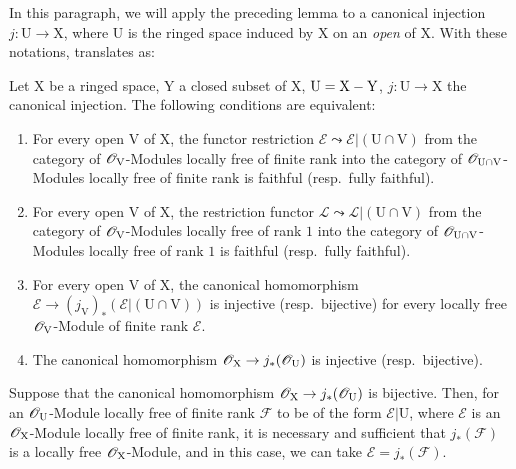 In this paragraph, we will apply the preceding lemma to a canonical injection $j:\mathrm{U}\to\mathrm{X}$, where $\mathrm{U}$ is the ringed space induced by $\mathrm{X}$ on an \emph{open} of $\mathrm{X}$.
With these notations,  translates as:

\begin{corollary}[21.13.3]
\label{IV.21.13.3}
Let $\mathrm{X}$ be a ringed space, $\mathrm{Y}$ a closed subset of $\mathrm{X}$, $\mathrm{U}=\mathrm{X}-\mathrm{Y}$, $j:\mathrm{U}\to\mathrm{X}$ the canonical injection.
The following conditions are equivalent:
\begin{enumerate}[label=\emph{\alph*)}]
  \item For every open $\mathrm{V}$ of $\mathrm{X}$, the functor restriction $\mathscr{E}\leadsto\mathscr{E}|(\mathrm{U}\cap\mathrm{V})$ from the category of $\mathscr{O}_{\mathrm{V}}$-Modules locally free of finite rank into the category of $\mathscr{O}_{\mathrm{U}\cap\mathrm{V}}$-Modules locally free of finite rank is faithful \textup{(resp.}\ fully faithful\textup{)}.
  \item[\emph{a')}] For every open $\mathrm{V}$ of $\mathrm{X}$, the restriction functor $\mathscr{L}\leadsto\mathscr{L}|(\mathrm{U}\cap\mathrm{V})$ from the category of $\mathscr{O}_{\mathrm{V}}$-Modules locally free of rank $1$ into the category of $\mathscr{O}_{\mathrm{U}\cap\mathrm{V}}$-Modules locally free of rank $1$ is faithful \textup{(resp.}\ fully faithful\textup{)}.
  \item For every open $\mathrm{V}$ of $\mathrm{X}$, the canonical homomorphism $\mathscr{E}\to(j_{\mathrm{V}})_*(\mathscr{E}|(\mathrm{U}\cap\mathrm{V}))$ is injective \textup{(resp.}\ bijective\textup{)} for every locally free $\mathscr{O}_{\mathrm{V}}$-Module of finite rank $\mathscr{E}$.
  \item[\emph{b')}] The canonical homomorphism $\mathscr{O}_{\mathrm{X}}\to j_*(\mathscr{O}_{\mathrm{U}})$ is injective \textup{(resp.}\ bijective\textup{)}.
\end{enumerate}

Suppose that the canonical homomorphism $\mathscr{O}_{\mathrm{X}}\to j_*(\mathscr{O}_{\mathrm{U}})$ is bijective.
Then, for an $\mathscr{O}_{\mathrm{U}}$-Module locally free of finite rank $\mathscr{F}$ to be of the form $\mathscr{E}|\mathrm{U}$, where $\mathscr{E}$ is an $\mathscr{O}_{\mathrm{X}}$-Module locally free of finite rank, it is necessary and sufficient that $j_*(\mathscr{F})$ is a locally free $\mathscr{O}_{\mathrm{X}}$-Module, and in this case, we can take $\mathscr{E}=j_*(\mathscr{F})$.
\end{corollary}

